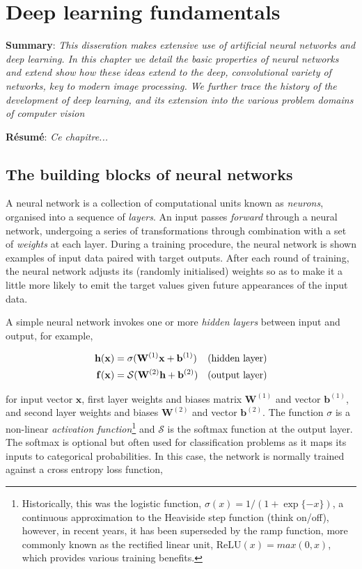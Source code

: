 
\chapter{Deep learning fundamentals} %
\label{Chapter2} %

\textbf{Summary}: \emph{This disseration makes extensive use of artificial neural networks and deep learning. In this chapter we detail the basic properties of neural networks and extend show how these ideas extend to the deep, convolutional variety of networks, key to modern image processing. We further trace the history of the development of deep learning, and its extension into the various problem domains of computer vision}

\textbf{R\'esum\'e}: \emph{Ce chapitre...}

\section{The building blocks of neural networks}
\label{sec:building_blocks_nn}

A neural network is a collection of computational units known as \emph{neurons}, organised into a sequence of \emph{layers}. An input passes \emph{forward} through a neural network, undergoing a series of transformations through combination with a set of \emph{weights} at each layer. During a training procedure, the neural network is shown examples of input data paired with target outputs. After each round of training, the neural network adjusts its (randomly initialised) weights so as to make it a little more likely to emit the target values given future appearances of the input data.

A simple neural network invokes one or more \emph{hidden layers} between input and output, for example,

\begin{align}
\mathbf{h}(\mathbf{x}) &= \sigma(\mathbf{W}^{(1)}\mathbf{x}  + \mathbf{b}^{(1)}) & \text{(hidden layer)} \notag \\
\mathbf{f}(\mathbf{x}) &= \mathcal{S}(\mathbf{W}^{(2)}\mathbf{h} + \mathbf{b}^{(2)}) & \text{(output layer)}
\end{align}

for input vector $\mathbf{x}$, first layer weights and biases matrix $\mathbf{W}^{(1)}$ and vector $\mathbf{b}^{(1)}$, and second layer weights and biases $\mathbf{W}^{(2)}$ and vector $\mathbf{b}^{(2)}$. The function $\sigma$ is a non-linear \emph{activation function}\footnote{Historically, this was the logistic function, $\sigma(x) = 1 / (1 + \exp{\{-x\}})$, a continuous approximation to the Heaviside step function (think on/off), however, in recent years, it has been superseded by the ramp function, more commonly known as the rectified linear unit, $\text{ReLU}(x) = max(0, x)$, which provides various training benefits.} and $\mathcal{S}$ is the softmax function at the output layer. The softmax is optional but often used for classification problems as it maps its inputs to categorical probabilities. In this case, the network is normally trained against a cross entropy loss function,

